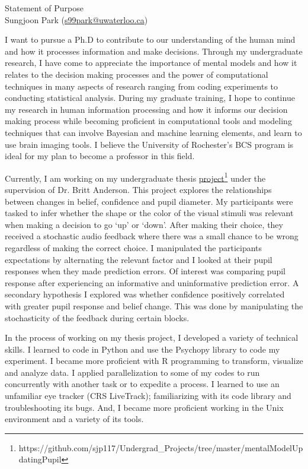 \documentclass[12pt]{article}
\let\oldcenter\center
\let\oldendcenter\endcenter
\renewenvironment{center}{\setlength\topsep{-1pt}\oldcenter}{\oldendcenter}
\begin{document}
	
	\begin{center}
		{\Large Statement of Purpose} \\
		{\normalsize Sungjoon Park (\href{mailto:s99park@uwaterloo.ca}{s99park@uwaterloo.ca})}
	\end{center}
	
	I want to pursue a Ph.D to contribute to our understanding of the human mind and how it processes information and make decisions. Through my undergraduate research, I have come to appreciate the importance of mental models and how it relates to the decision making processes and the power of computational techniques in many aspects of research ranging from coding experiments to conducting statistical analysis. During my graduate training, I hope to continue my research in human information processing and how it informs our decision making process while becoming proficient in computational tools and modeling techniques that can involve Bayesian and machine learning elements, and learn to use brain imaging tools. I believe the University of Rochester's BCS program is ideal for my plan to become a professor in this field.
	
	Currently, I am working on my undergraduate thesis \href{https://github.com/sjp117/Undergrad_Projects/tree/master/mentalModelUpdatingPupil}{project}\footnote{https://github.com/sjp117/Undergrad\_Projects/tree/master/mentalModelUpdatingPupil} under the supervision of Dr. Britt Anderson. This project explores the relationships between changes in belief, confidence and pupil diameter. My participants were tasked to infer whether the shape or the color of the visual stimuli was relevant when making a decision to go `up' or `down'. After making their choice, they received a stochastic audio feedback where there was a small chance to be wrong regardless of making the correct choice. I manipulated the participants expectations by alternating the relevant factor and I looked at their pupil responses when they made prediction errors. Of interest was comparing pupil response after experiencing an informative and uninformative prediction error. A secondary hypothesis I explored was whether confidence positively correlated with greater pupil response and belief change. This was done by manipulating the stochasticity of the feedback during certain blocks.
	
	In the process of working on my thesis project, I developed a variety of technical skills. I learned to code in Python and use the Psychopy library to code my experiment. I became more proficient with R programming to transform, visualize and analyze data. I applied parallelization to some of my codes to run concurrently with another task or to expedite a process. I learned to use an unfamiliar eye tracker (CRS LiveTrack); familiarizing with its code library and troubleshooting its bugs. And, I became more proficient working in the Unix environment and a variety of its tools.
	
\end{document}
